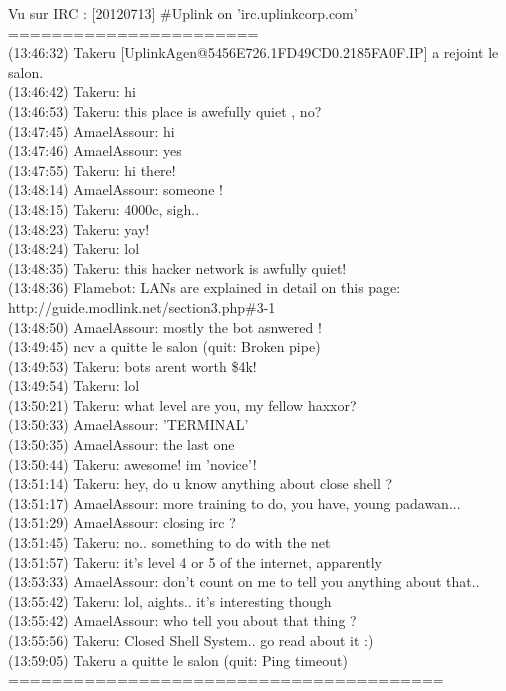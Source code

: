 \documentclass[11pt,twoside,a4paper]{book}
\begin{document}
\begin{minipage}[h]{0.90\textwidth} %
	\footnotesize
Vu sur IRC : [20120713] \#Uplink on 'irc.uplinkcorp.com' ~\\
======================= ~\\
(13:46:32) Takeru [UplinkAgen@5456E726.1FD49CD0.2185FA0F.IP] a rejoint le salon. ~\\
(13:46:42) Takeru: hi ~\\
(13:46:53) Takeru: this place is awefully quiet , no? ~\\
(13:47:45) AmaelAssour: hi ~\\
(13:47:46) AmaelAssour: yes ~\\
(13:47:55) Takeru: hi there! ~\\
(13:48:14) AmaelAssour: someone ! ~\\
(13:48:15) Takeru: 4000c, sigh.. ~\\
(13:48:23) Takeru: yay! ~\\
(13:48:24) Takeru: lol ~\\
(13:48:35) Takeru: this hacker network is awfully quiet! ~\\
(13:48:36) Flamebot: LANs are explained in detail on this page: http://guide.modlink.net/section3.php\#3-1 ~\\
(13:48:50) AmaelAssour: mostly the bot asnwered ! ~\\
(13:49:45) ncv a quitte le salon (quit: Broken pipe) ~\\
(13:49:53) Takeru: bots arent worth \$4k! ~\\
(13:49:54) Takeru: lol ~\\
(13:50:21) Takeru: what level are you, my fellow haxxor? ~\\
(13:50:33) AmaelAssour: 'TERMINAL' ~\\
(13:50:35) AmaelAssour: the last one ~\\
(13:50:44) Takeru: awesome! im 'novice'! ~\\
(13:51:14) Takeru: hey, do u know anything about close shell ? ~\\
(13:51:17) AmaelAssour: more training to do, you have, young padawan... ~\\
(13:51:29) AmaelAssour: closing irc ? ~\\
(13:51:45) Takeru: no.. something to do with the net ~\\
(13:51:57) Takeru: it's level 4 or 5 of the internet, apparently ~\\
(13:53:33) AmaelAssour: don't count on me to tell you anything about that.. ~\\
(13:55:42) Takeru: lol, aights.. it's interesting though ~\\
(13:55:42) AmaelAssour: who tell you about that thing ? ~\\
(13:55:56) Takeru: Closed Shell System.. go read about it :) ~\\
(13:59:05) Takeru a quitte le salon (quit: Ping timeout) ~\\
======================================== ~\\
\end{minipage} %
\end{document}
